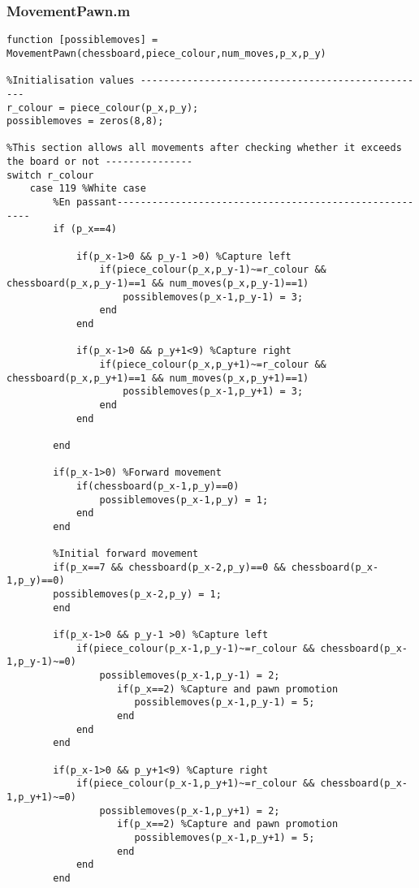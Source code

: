 \documentclass{article}
\begin{document}
\subsubsection{MovementPawn.m}
\begin{lstlisting}
function [possiblemoves] = MovementPawn(chessboard,piece_colour,num_moves,p_x,p_y)

%Initialisation values --------------------------------------------------
r_colour = piece_colour(p_x,p_y);
possiblemoves = zeros(8,8);

%This section allows all movements after checking whether it exceeds the board or not ---------------
switch r_colour
    case 119 %White case
        %En passant-------------------------------------------------------
        if (p_x==4)
            
            if(p_x-1>0 && p_y-1 >0) %Capture left
                if(piece_colour(p_x,p_y-1)~=r_colour && chessboard(p_x,p_y-1)==1 && num_moves(p_x,p_y-1)==1)
                    possiblemoves(p_x-1,p_y-1) = 3;
                end
            end

            if(p_x-1>0 && p_y+1<9) %Capture right
                if(piece_colour(p_x,p_y+1)~=r_colour && chessboard(p_x,p_y+1)==1 && num_moves(p_x,p_y+1)==1)
                    possiblemoves(p_x-1,p_y+1) = 3;
                end    
            end
        
        end
        
        if(p_x-1>0) %Forward movement
            if(chessboard(p_x-1,p_y)==0)
                possiblemoves(p_x-1,p_y) = 1;
            end
        end
        
        %Initial forward movement
        if(p_x==7 && chessboard(p_x-2,p_y)==0 && chessboard(p_x-1,p_y)==0)
        possiblemoves(p_x-2,p_y) = 1;
        end

        if(p_x-1>0 && p_y-1 >0) %Capture left
            if(piece_colour(p_x-1,p_y-1)~=r_colour && chessboard(p_x-1,p_y-1)~=0)
                possiblemoves(p_x-1,p_y-1) = 2;
                   if(p_x==2) %Capture and pawn promotion
                      possiblemoves(p_x-1,p_y-1) = 5;
                   end
            end
        end

        if(p_x-1>0 && p_y+1<9) %Capture right
            if(piece_colour(p_x-1,p_y+1)~=r_colour && chessboard(p_x-1,p_y+1)~=0)
                possiblemoves(p_x-1,p_y+1) = 2;
                   if(p_x==2) %Capture and pawn promotion
                      possiblemoves(p_x-1,p_y+1) = 5;
                   end
            end
        end    
        

\end{lstlisting}
\end{document}
